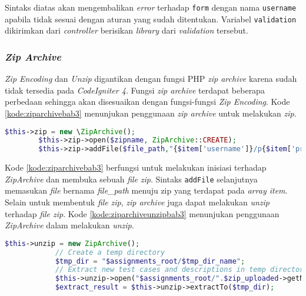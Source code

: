 Sintaks diatas akan mengembalikan \textit{error} terhadap \texttt{form} dengan nama \texttt{username} apabila tidak sesuai dengan aturan yang sudah ditentukan. Variabel \texttt{validation} dikirimkan dari \textit{controller} berisikan \textit{library} dari \textit{validation} tersebut. 

\subsubsection{\textit{Zip Archive}}
\label{subsubsec:ziparchivebab3}
\textit{Zip Encoding} dan \textit{Unzip} digantikan dengan fungsi PHP \textit{zip archive} karena sudah tidak tersedia pada \textit{CodeIgniter 4}. Fungsi \textit{zip archive} terdapat beberapa perbedaan sehingga akan disesuaikan dengan fungsi-fungsi \textit{Zip Encoding}. Kode \ref{kode:ziparchivebab3} menunjukan penggunaan \textit{zip archive} untuk melakukan \textit{zip}.

\begin{lstlisting}[language=PHP, caption=Contoh perubahan penggunaan \textit{library Zip Archive} untuk melakukan \textit{zip}, label=kode:ziparchivebab3]
		$this->zip = new \ZipArchive();
		$this->zip->open($zipname, ZipArchive::CREATE);
		$this->zip->addFile($file_path,"{$item['username']}/p{$item['problem']}.".filetype_to_extension($item['file_type']));
\end{lstlisting}

Kode \ref{kode:ziparchivebab3} berfungsi untuk melakukan inisiasi terhadap \textit{ZipArchive} dan membuka sebuah \textit{file} \textit{zip}. Sintaks \texttt{addFile} selanjutnya memasukan \textit{file} bernama \textit{file\_path} menuju zip yang terdapat pada \textit{array item}. Selain untuk membentuk \textit{file} \textit{zip}, \textit{zip archive} juga dapat melakukan \textit{unzip} terhadap \textit{file zip}. Kode \ref{kode:ziparchiveunzipbab3} menunjukan penggunaan \textit{ZipArchive} dalam melakukan \textit{unzip}.
\begin{lstlisting}[language=PHP, caption=Contoh perubahan penggunaan\textit{library ZipArhive} untuk melakukan \textit{unzip}, label=kode:ziparchiveunzipbab3]
		$this->unzip = new ZipArchive();
			// Create a temp directory
			$tmp_dir = "$assignments_root/$tmp_dir_name";
			// Extract new test cases and descriptions in temp directory
			$this->unzip->open("$assignments_root/".$zip_uploaded->getName());
			$extract_result = $this->unzip->extractTo($tmp_dir);
\end{lstlisting}

